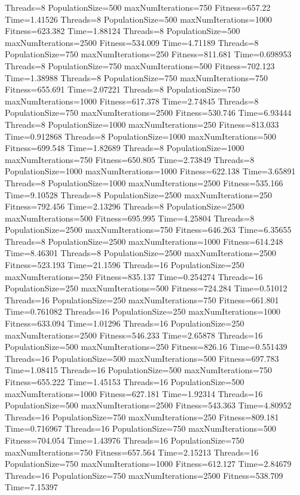 \documentclass[10pt,letterpaper]{article}
\begin{document}
Threads=8 PopulationSize=500 maxNumIterations=750 Fitness=657.22 Time=1.41526
Threads=8 PopulationSize=500 maxNumIterations=1000 Fitness=623.382 Time=1.88124
Threads=8 PopulationSize=500 maxNumIterations=2500 Fitness=534.009 Time=4.71189
Threads=8 PopulationSize=750 maxNumIterations=250 Fitness=811.681 Time=0.698953
Threads=8 PopulationSize=750 maxNumIterations=500 Fitness=702.123 Time=1.38988
Threads=8 PopulationSize=750 maxNumIterations=750 Fitness=655.691 Time=2.07221
Threads=8 PopulationSize=750 maxNumIterations=1000 Fitness=617.378 Time=2.74845
Threads=8 PopulationSize=750 maxNumIterations=2500 Fitness=530.746 Time=6.93444
Threads=8 PopulationSize=1000 maxNumIterations=250 Fitness=813.033 Time=0.912868
Threads=8 PopulationSize=1000 maxNumIterations=500 Fitness=699.548 Time=1.82689
Threads=8 PopulationSize=1000 maxNumIterations=750 Fitness=650.805 Time=2.73849
Threads=8 PopulationSize=1000 maxNumIterations=1000 Fitness=622.138 Time=3.65891
Threads=8 PopulationSize=1000 maxNumIterations=2500 Fitness=535.166 Time=9.10528
Threads=8 PopulationSize=2500 maxNumIterations=250 Fitness=792.456 Time=2.13296
Threads=8 PopulationSize=2500 maxNumIterations=500 Fitness=695.995 Time=4.25804
Threads=8 PopulationSize=2500 maxNumIterations=750 Fitness=646.263 Time=6.35655
Threads=8 PopulationSize=2500 maxNumIterations=1000 Fitness=614.248 Time=8.46301
Threads=8 PopulationSize=2500 maxNumIterations=2500 Fitness=523.193 Time=21.1596
Threads=16 PopulationSize=250 maxNumIterations=250 Fitness=835.137 Time=0.254274
Threads=16 PopulationSize=250 maxNumIterations=500 Fitness=724.284 Time=0.51012
Threads=16 PopulationSize=250 maxNumIterations=750 Fitness=661.801 Time=0.761082
Threads=16 PopulationSize=250 maxNumIterations=1000 Fitness=633.094 Time=1.01296
Threads=16 PopulationSize=250 maxNumIterations=2500 Fitness=546.233 Time=2.65878
Threads=16 PopulationSize=500 maxNumIterations=250 Fitness=826.16 Time=0.551439
Threads=16 PopulationSize=500 maxNumIterations=500 Fitness=697.783 Time=1.08415
Threads=16 PopulationSize=500 maxNumIterations=750 Fitness=655.222 Time=1.45153
Threads=16 PopulationSize=500 maxNumIterations=1000 Fitness=627.181 Time=1.92314
Threads=16 PopulationSize=500 maxNumIterations=2500 Fitness=543.363 Time=4.80952
Threads=16 PopulationSize=750 maxNumIterations=250 Fitness=809.181 Time=0.716967
Threads=16 PopulationSize=750 maxNumIterations=500 Fitness=704.054 Time=1.43976
Threads=16 PopulationSize=750 maxNumIterations=750 Fitness=657.564 Time=2.15213
Threads=16 PopulationSize=750 maxNumIterations=1000 Fitness=612.127 Time=2.84679
Threads=16 PopulationSize=750 maxNumIterations=2500 Fitness=538.709 Time=7.15397
\end{document}
